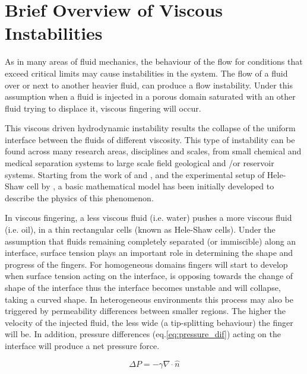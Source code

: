 \documentclass[preprint,authoryear,12pt]{elsarticle}
\begin{document}
\section{Brief Overview of Viscous Instabilities}\label{section:ViscousInstabilities}
\medskip
As in many areas of fluid mechanics, the behaviour of the flow for conditions that exceed critical limits may cause instabilities in the system. The flow of a fluid over or next to another heavier fluid, can produce a flow instability. Under this assumption when a fluid is injected in a porous domain saturated with an other fluid trying to displace it, viscous fingering will occur. 

\medskip
This viscous driven hydrodynamic instability results the collapse of the uniform interface between the fluids of different viscosity. This type of instability can be found across many research areas, disciplines and scales, from small chemical and medical separation systems to large scale field geological and /or reservoir systems. Starting from the work of \citet{saffman_1959} and \citet{homsy_1987}, and the experimental setup of Hele-Shaw cell by \citet{saffman_1986}, a basic mathematical model has been initially developed to describe the physics of this phenomenon. 

\medskip
In viscous fingering, a less viscous fluid (i.e. water) pushes a more viscous fluid (i.e. oil), in a thin rectangular cells (known as Hele-Shaw cells). Under the assumption that fluids remaining completely separated (or immiscible) along an interface, surface tension plays an important role in determining the shape and progress of the fingers. For homogeneous domains fingers will start to develop when surface tension acting on the interface, is opposing towards the change of shape of the interface thus the interface becomes unstable and will collapse, taking a curved shape. In heterogeneous environments this process may also be triggered by permeability differences between smaller regions. The higher the velocity of the injected fluid, the less wide (a tip-splitting behaviour) the finger will be. In addition, pressure differences (eq.\ref{eq:pressure_dif}) acting on the interface will produce a net pressure force.  

\begin{equation}
\Delta P= - \gamma \nabla \; \dot \; \hat{n} 
\label{eq:pressure_dif} 
\end{equation}
\end{document}
